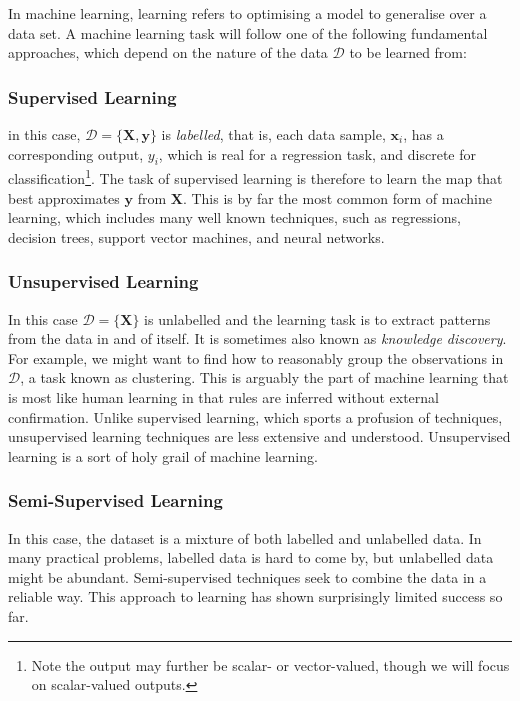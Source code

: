 \documentclass[11pt]{amsart}
\begin{document}
In machine learning, learning refers to optimising a model to generalise over a data set. A machine learning task will follow one of the following fundamental approaches, which depend on the nature of the data $\mathcal{D}$ to be learned from:

\subsubsection{Supervised Learning}

in this case, $\mathcal{D} = \{\mathbf{X}, \mathbf{y}\}$ is \emph{labelled}, that is, each data sample, $\mathbf{x}_i$, has a corresponding output, $y_i$, which is real for a regression task, and discrete for classification\footnote{Note the output may further be scalar- or vector-valued, though we will focus on scalar-valued outputs.}. The task of supervised learning is therefore to learn the map that best approximates $\mathbf{y}$ from $\mathbf{X}$. This is by far the most common form of machine learning, which includes many well known techniques, such as regressions, decision trees, support vector machines, and neural networks.

\subsubsection{Unsupervised Learning}

In this case $\mathcal{D} = \{\mathbf{X}\}$ is unlabelled and the learning task is to extract patterns from the data in and of itself. It is sometimes also known as \emph{knowledge discovery}. For example, we might want to find how to reasonably group the observations in $\mathcal{D}$, a task known as clustering. This is arguably the part of machine learning that is most like human learning in that rules are inferred without external confirmation. Unlike supervised learning, which sports a profusion of techniques, unsupervised learning techniques are less extensive and understood. Unsupervised learning is a sort of holy grail of machine learning.

\subsubsection{Semi-Supervised Learning}

In this case, the dataset is a mixture of both labelled and unlabelled data. In many practical problems, labelled data is hard to come by, but unlabelled data might be abundant. Semi-supervised techniques seek to combine the data in a reliable way. This approach to learning has shown surprisingly limited success so far.
\end{document}
